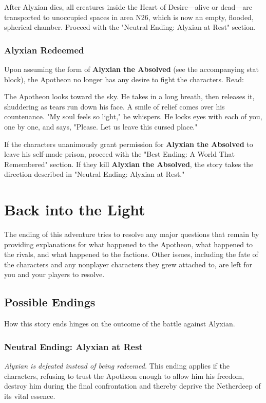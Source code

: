 \documentclass[10pt,a4,twoside,twocolumn,openany,nodeprecatedcode]{dndbook}
\begin{document}
After Alyxian dies, all creatures inside the Heart of Desire—alive or dead—are transported to unoccupied spaces in area N26, which is now an empty, flooded, spherical chamber. Proceed with the "Neutral Ending: Alyxian at Rest" section.
\subsubsection{Alyxian Redeemed}
Upon assuming the form of \textbf{Alyxian the Absolved} (see the accompanying stat block), the Apotheon no longer has any desire to fight the characters. Read:
\begin{DndReadAloud}{}
The Apotheon looks toward the sky. He takes in a long breath, then releases it, shuddering as tears run down his face. A smile of relief comes over his countenance.
"My soul feels so light," he whispers. He locks eyes with each of you, one by one, and says, "Please. Let us leave this cursed place."
\end{DndReadAloud}

If the characters unanimously grant permission for \textbf{Alyxian the Absolved} to leave his self-made prison, proceed with the "Best Ending: A World That Remembered" section. If they kill \textbf{Alyxian the Absolved}, the story takes the direction described in "Neutral Ending: Alyxian at Rest."
\section{Back into the Light}
The ending of this adventure tries to resolve any major questions that remain by providing explanations for what happened to the Apotheon, what happened to the rivals, and what happened to the factions. Other issues, including the fate of the characters and any nonplayer characters they grew attached to, are left for you and your players to resolve.
\subsection{Possible Endings}
How this story ends hinges on the outcome of the battle against Alyxian.
\subsubsection{Neutral Ending: Alyxian at Rest}
\textit{Alyxian is defeated instead of being redeemed.}
This ending applies if the characters, refusing to trust the Apotheon enough to allow him his freedom, destroy him during the final confrontation and thereby deprive the Netherdeep of its vital essence.
\end{document}
